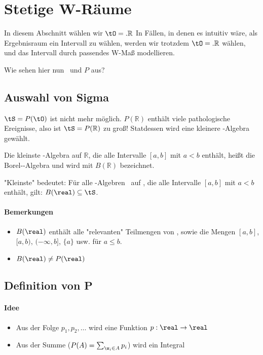 \section{Stetige W-Räume}
In diesem Abschnitt wählen wir $\tO = \mathbb{.R}$
In Fällen, in denen es intuitiv wäre, als Ergebnisraum ein Intervall zu wählen,
werden wir trotzdem $\tO = \mathbb{.R}$ wählen, und das Intervall durch passendes
W-Maß modellieren.

Wie sehen hier nun \tO\ und $P$ aus?

\subsection{Auswahl von Sigma}
$\tS = P(\tO)$ ist nicht mehr möglich. $P(\mathbb{R})$ enthält viele pathologische Ereignisse,
also ist $\tS = P(\mathbb{R})$ zu groß! Statdessen wird eine kleinere \ts-Algebra gewählt.

\begin{definition}
    Die kleinste \ts-Algebra auf $\mathbb{R}$, die alle Intervalle $[a,b]$ mit $a<b$
    enthält, heißt die Borel-\ts-Algebra und wird mit $B(\mathbb{R})$ bezeichnet.
\end{definition}

"Kleinste" bedeutet: Für alle \ts-Algebren \tS\ auf \real, die alle Intervalle $[a,b]$ mit
$a<b$ enthält, gilt: $B(\real) \subseteq  \tS$.

\paragraph{Bemerkungen}
\begin{itemize}
    \item $B(\real)$ enthält alle "relevanten" Teilmengen von \real, sowie die Mengen $[a,b]$,
          $[a,b)$, $(-\infty, b]$, $\{a\}$ usw. für $a \leq b$.
    \item $B(\real) \neq P(\real)$
\end{itemize}

\subsection{Definition von P}
\paragraph{Idee}
\begin{itemize}
    \item Aus der Folge $p_1, p_2, \dots$ wird eine Funktion $p: \real \to \real$
    \item Aus der Summe ($P(A)=\sum_{\w_i \in A} p_i$) wird ein Integral
\end{itemize}

